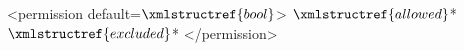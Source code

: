 <permission default=$\xmlstructref{bool}$>
  $\xmlstructref{allowed}$*
  $\xmlstructref{excluded}$*
</permission>
